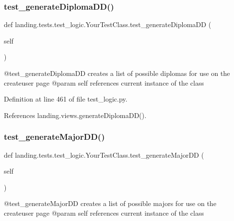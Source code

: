 \subsubsection{\texorpdfstring{test\+\_\+generate\+Diploma\+D\+D()}{test\_generateDiplomaDD()}}
{\footnotesize\ttfamily def landing.\+tests.\+test\+\_\+logic.\+Your\+Test\+Class.\+test\+\_\+generate\+Diploma\+DD (\begin{DoxyParamCaption}\item[{}]{self }\end{DoxyParamCaption})}

\begin{DoxyVerb}@test_generateDiplomaDD creates a list of possible diplomas for use on the createuser page
@param self references current instance of the class
\end{DoxyVerb}
 

Definition at line 461 of file test\+\_\+logic.\+py.



References landing.\+views.\+generate\+Diploma\+D\+D().

\mbox{\label{classlanding_1_1tests_1_1test__logic_1_1YourTestClass_a07dc170a7378ab65e26198097bf79421}} 
\subsubsection{\texorpdfstring{test\+\_\+generate\+Major\+D\+D()}{test\_generateMajorDD()}}
{\footnotesize\ttfamily def landing.\+tests.\+test\+\_\+logic.\+Your\+Test\+Class.\+test\+\_\+generate\+Major\+DD (\begin{DoxyParamCaption}\item[{}]{self }\end{DoxyParamCaption})}

\begin{DoxyVerb}@test_generateMajorDD creates a list of possible majors for use on the createuser page
@param self references current instance of the class
\end{DoxyVerb}
 

